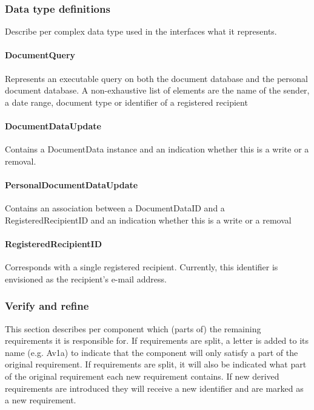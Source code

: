 \documentclass[a4paper,10pt]{article}
\begin{document}
\subsubsection{Data type definitions}
Describe per complex data type used in the interfaces what it represents.

\paragraph{DocumentQuery} Represents an executable query on both the document database and the personal document database. A non-exhaustive list of elements are the name of the sender, a date range, document type or identifier of a registered recipient

\paragraph{DocumentDataUpdate} Contains a DocumentData instance and an indication whether this is a write or a removal.

\paragraph{PersonalDocumentDataUpdate} Contains an association between a DocumentDataID and a RegisteredRecipientID and an indication whether this is a write or a removal

\paragraph{RegisteredRecipientID} Corresponds with a single registered recipient. Currently, this identifier is envisioned as the recipient's e-mail address.

\subsubsection{Verify and refine}
This section describes per component which (parts of) the remaining requirements it is responsible for. If requirements are split, a letter is added to its name (e.g. Av1a) to indicate that the component will only satisfy a part of the original requirement. If requirements are split, it will also be indicated what part of the original requirement each new requirement contains. If new derived requirements are introduced they will receive a new identifier and are marked as a new requirement.
\end{document}

